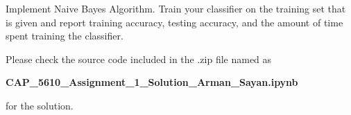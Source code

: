 \documentclass[12pt,letterpaper, onecolumn]{exam}
\begin{document}
\begin{questions}
    Implement Naive Bayes Algorithm. Train your classifier on the training set that is given and report training accuracy, testing accuracy, and the amount of time spent training the classifier.

    \begin{solution}
        Please check the source code included in the .zip file named as

        \begin{center}
            \textbf{CAP\_5610\_Assignment\_1\_Solution\_Arman\_Sayan.ipynb}
        \end{center}
        
        for the solution.
    \end{solution}

    \pagebreak
    
\end{questions}
\end{document}
